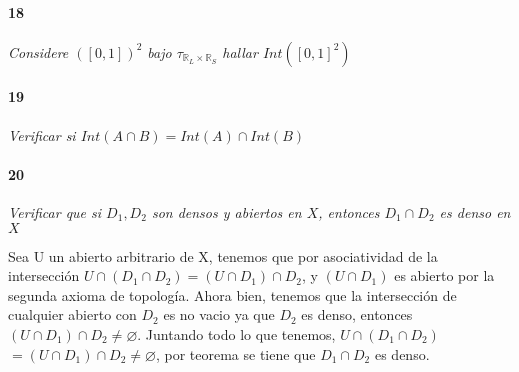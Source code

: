\documentclass[12pt]{article}
\begin{document}
\paragraph{18}
\textit{Considere $([0,1])^2$ bajo $\tau_{\mathbb{R}_L\times\mathbb{R}_S}$ hallar $Int([0,1]^2)$}

\paragraph{19}
\textit{Verificar si $Int(A\cap B)=Int(A)\cap Int(B)$}

\paragraph{20}
\textit{Verificar que si $D_{1}, D_{2}$ son densos y abiertos en $X$, entonces $D_{1} \cap D_{2}$ es denso en $X$}

Sea U un abierto arbitrario de X, tenemos que por
asociatividad de la intersecci\'on
$U \cap (D_{1} \cap D_{2}) = (U \cap D_{1}) \cap D_{2}$,
y $(U \cap D_{1})$ es abierto por la segunda axioma de
topolog\'ia. Ahora bien, tenemos que la intersecci\'on de
cualquier abierto con $D_{2}$ es no vacio ya que $D_{2}$ es
denso, entonces $(U \cap D_{1}) \cap D_{2} \neq \varnothing$.
Juntando todo lo que tenemos, $U \cap (D_{1} \cap D_{2})$
$= (U \cap D_{1}) \cap D_{2} \neq \varnothing$, por teorema
se tiene que $D_{1} \cap D_{2}$ es denso.
\end{document}
